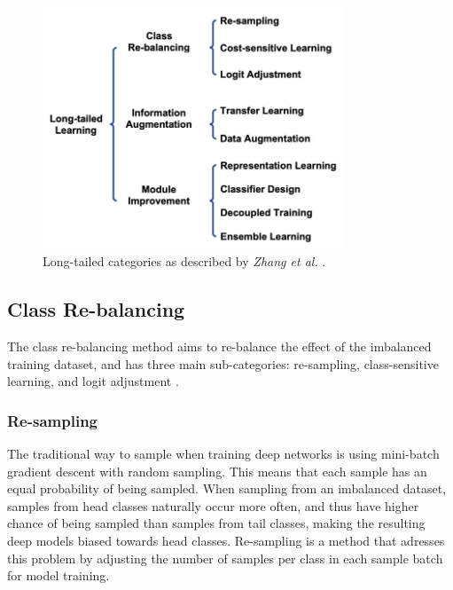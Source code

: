 
\begin{figure}[ht]
    \centering
    \includegraphics[width=0.8\textwidth]{Images/lt_methods_categories.png} 
    \caption{Long-tailed categories as described by \textit{Zhang et al.} \cite{zhang2023deep}.}
    \label{fig:lt_main_categories} %
\end{figure}

\subsection{Class Re-balancing}
\label{sec:class_rebal}
The class re-balancing method aims to re-balance the effect of the imbalanced training dataset, and has three main sub-categories: re-sampling, class-sensitive learning, and logit adjustment \cite{zhang2023deep}. 


\subsubsection{Re-sampling}
The traditional way to sample when training deep networks is using mini-batch gradient descent with random sampling. This means that each sample has an equal probability of being sampled. When sampling from an imbalanced dataset, samples from head classes naturally occur more often, and thus have higher chance of being sampled than samples from tail classes, making the resulting deep models biased towards head classes. Re-sampling is a method that adresses this problem by adjusting the number of samples per class in each sample batch for model training. 

